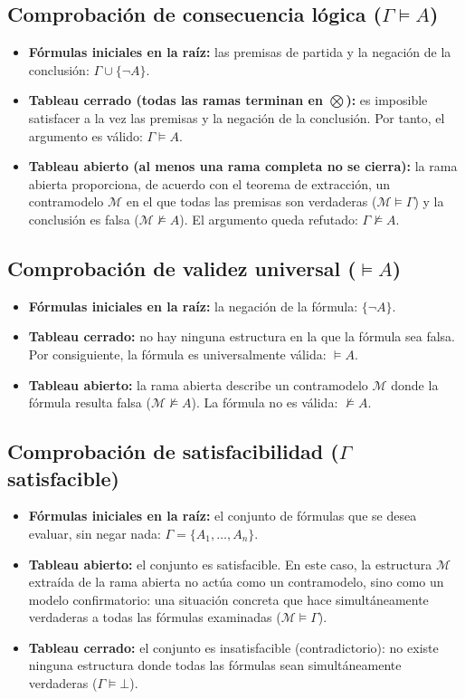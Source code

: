 \subsection{Comprobación de consecuencia lógica (\texorpdfstring{$\Gamma \models A$}{Gamma |= A})}
\begin{itemize}
    \item \textbf{Fórmulas iniciales en la raíz:} las premisas de partida y la negación de la conclusión: $\Gamma \cup \{\neg A\}$.
    \item \textbf{Tableau cerrado (todas las ramas terminan en $\bigotimes$):} es imposible satisfacer a la vez las premisas y la negación de la conclusión. Por tanto, el argumento es válido: $\Gamma \models A$.
    \item \textbf{Tableau abierto (al menos una rama completa no se cierra):} la rama abierta proporciona, de acuerdo con el teorema de extracción, un contramodelo $\mathcal{M}$ en el que todas las premisas son verdaderas ($\mathcal{M} \models \Gamma$) y la conclusión es falsa ($\mathcal{M} \not\models A$). El argumento queda refutado: $\Gamma \not\models A$.
\end{itemize}

\subsection{Comprobación de validez universal (\texorpdfstring{$\models A$}{|= A})}
\begin{itemize}
    \item \textbf{Fórmulas iniciales en la raíz:} la negación de la fórmula: $\{\neg A\}$.
    \item \textbf{Tableau cerrado:} no hay ninguna estructura en la que la fórmula sea falsa. Por consiguiente, la fórmula es universalmente válida: $\models A$.
    \item \textbf{Tableau abierto:} la rama abierta describe un contramodelo $\mathcal{M}$ donde la fórmula resulta falsa ($\mathcal{M} \not\models A$). La fórmula no es válida: $\not\models A$.
\end{itemize}

\subsection{Comprobación de satisfacibilidad (\texorpdfstring{$\Gamma$}{Gamma} satisfacible)}
\begin{itemize}
    \item \textbf{Fórmulas iniciales en la raíz:} el conjunto de fórmulas que se desea evaluar, sin negar nada: $\Gamma = \{A_1, \dots, A_n\}$.
    \item \textbf{Tableau abierto:} el conjunto es satisfacible. En este caso, la estructura $\mathcal{M}$ extraída de la rama abierta no actúa como un contramodelo, sino como un modelo confirmatorio: una situación concreta que hace simultáneamente verdaderas a todas las fórmulas examinadas ($\mathcal{M} \models \Gamma$).
    \item \textbf{Tableau cerrado:} el conjunto es insatisfacible (contradictorio): no existe ninguna estructura donde todas las fórmulas sean simultáneamente verdaderas ($\Gamma \models \bot$).
\end{itemize}


